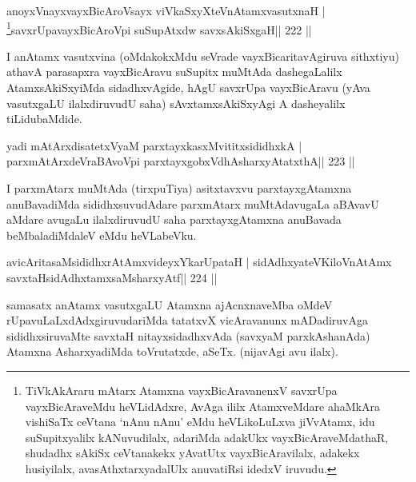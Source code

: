 
\begin{shl}
\footnotemark[\value{footnote}]anoyxVnayxvayxBicAroV\s sayx viVkaSxyXteV\s nAtamxvasutxnaH |
\footnote{TiVkAkAraru mAtarx Atamxna vayxBicAravanenxV savxrUpa
  vayxBicAraveMdu heVLidAdxre, AvAga ililx AtamxveMdare ahaMkAra
  vishiSaTx ceVtana `nAnu nAnu' eMdu heVLikoLuLxva jiVvAtamx, idu
  suSupitxyalilx kANuvudilalx, adariMda adakUkx vayxBicAraveMdathaR,
  shudadhx sAkiSx ceVtanakekx yAvatUtx vayxBicAravilalx, adakekx
  husiyilalx, avasAthxtarxyadalUlx anuvatiRsi idedxV iruvudu.}savxrUpavayxBicAroV\s pi suSupAtxdw savxsAkiSxgaH\hfill || 222 ||
\end{shl}

\begin{artha}
I anAtamx vasutxvina (oMdakokxMdu seVrade vayxBicaritavAgiruva sithxtiyu) athavA parasapxra vayxBicAravu suSupitx muMtAda dashegaLalilx AtamxsAkiSxyiMda sidadhxvAgide, hAgU savxrUpa vayxBicAravu (yAva vasutxgaLU ilalxdiruvudU saha) sAvxtamxsAkiSxyAgi A dasheyalilx tiLidubaMdide.
\end{artha}

\begin{shl}
yadi mAtArxdisatetxVyaM parxtayxkasxMvititxsididhxkA |
parxmAtArxdeVraBAvoV\s pi parxtayxgobxVdhAsharxyAtatxthA\hfill || 223 ||
\end{shl}

\begin{artha}
I  parxmAtarx muMtAda (tirxpuTiya) asitxtavxvu parxtayxgAtamxna anuBavadiMda sididhxsuvudAdare parxmAtarx muMtAdavugaLa aBAvavU aMdare avugaLu ilalxdiruvudU saha parxtayxgAtamxna anuBavada beMbaladiMdaleV eMdu heVLabeVku.
\end{artha}


\begin{shl}
avicAritasaMsididhxrAtAmxvideyxYkarUpataH |
sidAdhxyateV\s KiloV\s nAtAmx savxtaHsidAdhxtamxsaMsharxyAtf\hfill || 224 ||
\end{shl}

\begin{artha}
samasatx anAtamx vasutxgaLU Atamxna ajAcnxnaveMba oMdeV rUpavuLaLxdAdxgiruvudariMda tatatxvX vicAravanunx mADadiruvAga sididhxsiruvaMte savxtaH nitayxsidadhxvAda (savxyaM parxkAshanAda) Atamxna AsharxyadiMda toVrutatxde, aSeTx. (nijavAgi avu ilalx).
\end{artha}

